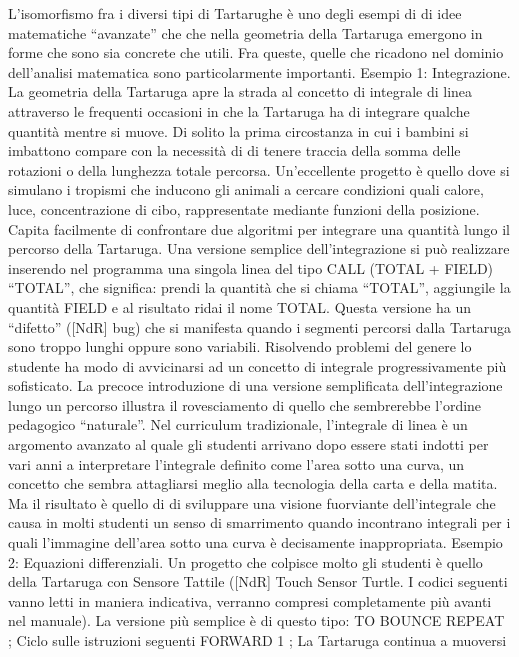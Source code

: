 {L'isomorfismo fra i diversi tipi di Tartarughe è uno degli esempi di di idee matematiche “avanzate” che che nella geometria della Tartaruga emergono in forme che sono sia concrete che utili. Fra queste, quelle che ricadono nel dominio dell'analisi matematica sono particolarmente importanti.
Esempio 1: Integrazione. La geometria della Tartaruga apre la strada al concetto di integrale di linea attraverso le frequenti occasioni in che la Tartaruga ha di integrare qualche quantità mentre si muove. Di solito la prima circostanza in cui i bambini si imbattono compare con la necessità di di tenere traccia della somma delle rotazioni o della lunghezza totale percorsa. Un'eccellente progetto è quello dove si simulano i tropismi che inducono gli animali a cercare condizioni quali calore, luce, concentrazione di cibo, rappresentate mediante funzioni della posizione. Capita facilmente di confrontare due algoritmi per integrare una quantità lungo il percorso della Tartaruga. Una versione semplice dell'integrazione si può realizzare inserendo nel programma una singola linea del tipo CALL (TOTAL + FIELD) “TOTAL”, che significa: prendi la quantità che si chiama “TOTAL”, aggiungile la quantità FIELD e al risultato ridai il nome TOTAL. Questa versione ha un “difetto” ([NdR] bug) che si manifesta quando i segmenti percorsi dalla Tartaruga sono troppo lunghi oppure sono variabili. Risolvendo problemi del genere lo studente ha modo di avvicinarsi ad un concetto di integrale progressivamente più sofisticato.
La precoce introduzione di una versione semplificata dell'integrazione lungo un percorso illustra il rovesciamento di quello che sembrerebbe l'ordine pedagogico “naturale”. Nel curriculum tradizionale, l'integrale di linea è un argomento avanzato al quale gli studenti arrivano dopo essere stati indotti per vari anni a interpretare l'integrale definito come l'area sotto una curva, un concetto che sembra attagliarsi meglio alla tecnologia della carta e della matita. Ma il risultato è quello di di sviluppare una visione fuorviante dell'integrale che causa in molti studenti un senso di smarrimento quando incontrano integrali per i quali l'immagine dell'area sotto una curva è decisamente inappropriata. Esempio 2: Equazioni differenziali. Un progetto che colpisce molto gli studenti è quello della Tartaruga con Sensore Tattile ([NdR] Touch Sensor Turtle. I codici seguenti vanno letti in maniera indicativa, verranno compresi completamente più avanti nel manuale). La versione più semplice è di questo tipo:
TO BOUNCE
REPEAT		; Ciclo sulle istruzioni seguenti
 FORWARD 1		; La Tartaruga continua a muoversi
}
